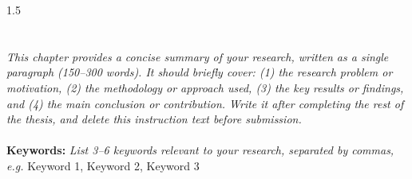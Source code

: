 
\begin{spacing}{1.5}
\section*{}

\vspace{.5cm}
\textit{This chapter provides a concise summary of your research, written as a single paragraph (150--300 words). It should briefly cover: (1) the research problem or motivation, (2) the methodology or approach used, (3) the key results or findings, and (4) the main conclusion or contribution. Write it after completing the rest of the thesis, and delete this instruction text before submission.}
\\ \\
\textbf{Keywords:}
\textit{List 3--6 keywords relevant to your research, separated by commas, e.g.} Keyword 1, Keyword 2, Keyword 3
\end{spacing}
